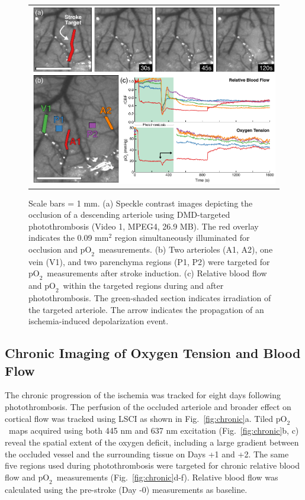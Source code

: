 \documentclass[12pt]{spieman}  %
\newcommand{\pO}{\ensuremath{\text{pO}_2}}
\begin{document}
\begin{spacing}{2}
\begin{figure}
    \begin{center}
        \begin{tabular}{c}
            \includegraphics[width=6.25in]{Figure5.pdf}
        \end{tabular}
    \end{center}
    \caption {
        \label{fig:photothrombosis}
        Scale bars = 1 mm. (a) Speckle contrast images depicting the occlusion of a descending arteriole using DMD-targeted photothrombosis (Video 1, MPEG4, 26.9 MB). The red overlay indicates the 0.09 mm$^{2}$ region simultaneously illuminated for occlusion and \pO\ measurements. (b) Two arterioles (A1, A2), one vein (V1), and two parenchyma regions (P1, P2) were targeted for \pO\ measurements after stroke induction. (c) Relative blood flow and \pO\ within the targeted regions during and after photothrombosis. The green-shaded section indicates irradiation of the targeted arteriole. The arrow indicates the propagation of an ischemia-induced depolarization event.
    }
\end{figure}


\subsection{Chronic Imaging of Oxygen Tension and Blood Flow}

The chronic progression of the ischemia was tracked for eight days following photothrombosis. The perfusion of the occluded arteriole and broader effect on cortical flow was tracked using LSCI as shown in Fig.~\ref{fig:chronic}a. Tiled \pO\ maps acquired using both 445 nm and 637 nm excitation (Fig.~\ref{fig:chronic}b, c) reveal the spatial extent of the oxygen deficit, including a large gradient between the occluded vessel and the surrounding tissue on Days +1 and +2. The same five regions used during photothrombosis were targeted for chronic relative blood flow and \pO\ measurements (Fig.~\ref{fig:chronic}d-f). Relative blood flow was calculated using the pre-stroke (Day -0) measurements as baseline.


\end{spacing}
\end{document}
